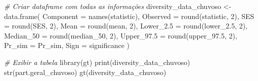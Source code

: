 \documentclass[
  letterpaper,
  DIV=11,
  numbers=noendperiod]{scrartcl}
\newenvironment{Shaded}{}{}
\newcommand{\AttributeTok}[1]{\textcolor[rgb]{0.49,0.56,0.16}{#1}}
\newcommand{\CommentTok}[1]{\textcolor[rgb]{0.38,0.63,0.69}{\textit{#1}}}
\newcommand{\DecValTok}[1]{\textcolor[rgb]{0.25,0.63,0.44}{#1}}
\newcommand{\FloatTok}[1]{\textcolor[rgb]{0.25,0.63,0.44}{#1}}
\newcommand{\FunctionTok}[1]{\textcolor[rgb]{0.02,0.16,0.49}{#1}}
\newcommand{\NormalTok}[1]{#1}
\newcommand{\OtherTok}[1]{\textcolor[rgb]{0.00,0.44,0.13}{#1}}
\begin{document}
\begin{Shaded}
\begin{Highlighting}[numbers=left,,]
\CommentTok{\# Criar dataframe com todas as informações}
\NormalTok{diversity\_data\_chuvoso }\OtherTok{\textless{}{-}} \FunctionTok{data.frame}\NormalTok{(}
  \AttributeTok{Component =} \FunctionTok{names}\NormalTok{(statistic),}
  \AttributeTok{Observed =} \FunctionTok{round}\NormalTok{(statistic, }\DecValTok{2}\NormalTok{),}
  \AttributeTok{SES =} \FunctionTok{round}\NormalTok{(SES, }\DecValTok{2}\NormalTok{),}
  \AttributeTok{Mean =} \FunctionTok{round}\NormalTok{(mean, }\DecValTok{2}\NormalTok{),}
  \AttributeTok{Lower\_2.5 =} \FunctionTok{round}\NormalTok{(lower\_2}\FloatTok{.5}\NormalTok{, }\DecValTok{2}\NormalTok{),}
  \AttributeTok{Median\_50 =} \FunctionTok{round}\NormalTok{(median\_50, }\DecValTok{2}\NormalTok{),}
  \AttributeTok{Upper\_97.5 =} \FunctionTok{round}\NormalTok{(upper\_97}\FloatTok{.5}\NormalTok{, }\DecValTok{2}\NormalTok{),}
  \AttributeTok{Pr\_sim =}\NormalTok{ Pr\_sim,}
  \AttributeTok{Sign =}\NormalTok{ significance}
\NormalTok{)}

\CommentTok{\# Exibir a tabela}
\FunctionTok{library}\NormalTok{(gt)}
\FunctionTok{print}\NormalTok{(diversity\_data\_chuvoso)}
\FunctionTok{str}\NormalTok{(part.geral\_chuvoso)}
\FunctionTok{gt}\NormalTok{(diversity\_data\_chuvoso)}


\end{Highlighting}
\end{Shaded}
\end{document}
